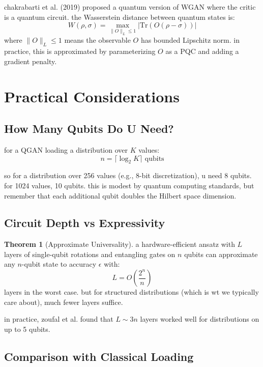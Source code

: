 \documentclass[11pt,a4paper]{article}
\theoremstyle{definition}
\newtheorem{theorem}{Theorem}[section]
\theoremstyle{remark}
\begin{document}
chakrabarti et al. (2019) proposed a quantum version of WGAN where the critic is a quantum circuit. the Wasserstein distance between quantum states is:
\[
W(\rho, \sigma) = \max_{\|O\|_L \leq 1} |\mathrm{Tr}(O(\rho - \sigma))|
\]
where $\|O\|_L \leq 1$ means the observable $O$ has bounded Lipschitz norm. in practice, this is approximated by parameterizing $O$ as a PQC and adding a gradient penalty.

\section{Practical Considerations}

\subsection{How Many Qubits Do U Need?}

for a QGAN loading a distribution over $K$ values:
\[
n = \lceil \log_2 K \rceil \text{ qubits}
\]

so for a distribution over 256 values (e.g., 8-bit discretization), u need 8 qubits. for 1024 values, 10 qubits. this is modest by quantum computing standards, but remember that each additional qubit doubles the Hilbert space dimension.

\subsection{Circuit Depth vs Expressivity}

\begin{theorem}[Approximate Universality]
a hardware-efficient ansatz with $L$ layers of single-qubit rotations and entangling gates on $n$ qubits can approximate any $n$-qubit state to accuracy $\epsilon$ with:
\[
L = O\left(\frac{2^n}{n}\right)
\]
layers in the worst case. but for structured distributions (which is wt we typically care about), much fewer layers suffice.
\end{theorem}

in practice, zoufal et al. found that $L \sim 3n$ layers worked well for distributions on up to 5 qubits.

\subsection{Comparison with Classical Loading}
\end{document}
